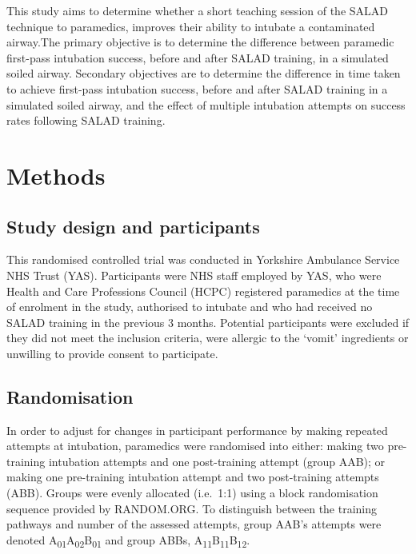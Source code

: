 \documentclass[]{article}
\begin{document}
This study aims to determine whether a short teaching session of the
SALAD technique to paramedics, improves their ability to intubate a
contaminated airway.The primary objective is to determine the difference
between paramedic first-pass intubation success, before and after SALAD
training, in a simulated soiled airway. Secondary objectives are to
determine the difference in time taken to achieve first-pass intubation
success, before and after SALAD training in a simulated soiled airway,
and the effect of multiple intubation attempts on success rates
following SALAD training.

\hypertarget{methods-1}{%
\section{Methods}\label{methods-1}}

\hypertarget{study-design-and-participants}{%
\subsection{Study design and
participants}\label{study-design-and-participants}}

This randomised controlled trial was conducted in Yorkshire Ambulance
Service NHS Trust (YAS). Participants were NHS staff employed by YAS,
who were Health and Care Professions Council (HCPC) registered
paramedics at the time of enrolment in the study, authorised to intubate
and who had received no SALAD training in the previous 3 months.
Potential participants were excluded if they did not meet the inclusion
criteria, were allergic to the `vomit' ingredients or unwilling to
provide consent to participate.

\hypertarget{randomisation}{%
\subsection{Randomisation}\label{randomisation}}

In order to adjust for changes in participant performance by making
repeated attempts at intubation, paramedics were randomised into either:
making two pre-training intubation attempts and one post-training
attempt (group AAB); or making one pre-training intubation attempt and
two post-training attempts (ABB). Groups were evenly allocated
(i.e.~1:1) using a block randomisation sequence provided by RANDOM.ORG.
To distinguish between the training pathways and number of the assessed
attempts, group AAB's attempts were denoted
A\textsubscript{01}A\textsubscript{02}B\textsubscript{01} and group
ABBs, A\textsubscript{11}B\textsubscript{11}B\textsubscript{12}.
\end{document}
